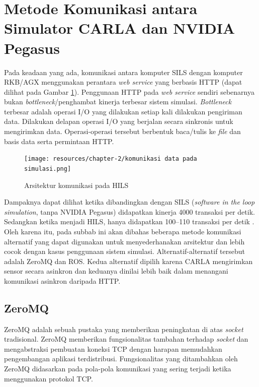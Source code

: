 \section{Metode Komunikasi antara Simulator CARLA dan NVIDIA
  Pegasus}\label{chapter-2-section-comms}

Pada keadaan yang ada, komunikasi antara komputer SILS dengan komputer RKB/AGX
menggunakan perantara \textit{web service} yang berbasis HTTP (dapat dilihat
pada Gambar \ref{chapter-2-old-hils}). Penggunaan HTTP pada \textit{web service}
sendiri sebenarnya bukan \textit{bottleneck}/penghambat kinerja terbesar sistem
simulasi. \textit{Bottleneck} terbesar adalah operasi I/O yang dilakukan setiap
kali dilakukan pengiriman data. Dilakukan delapan operasi I/O yang berjalan
secara sinkronis untuk mengirimkan data. Operasi-operasi tersebut berbentuk
baca/tulis ke \textit{file} dan basis data serta permintaan HTTP.

\begin{figure}[h!]
	\centering
	\texttt{[image: resources/chapter-2/komunikasi
		data pada simulasi.png]}
	\caption{Arsitektur komunikasi pada HILS \parencite{trilaksono_laporanRispro}}
	\label{chapter-2-old-hils}
\end{figure}

Dampaknya dapat dilihat ketika dibandingkan dengan SILS (\textit{software
	in the loop simulation}, tanpa NVIDIA Pegasus) didapatkan kinerja 4000 transaksi
per detik. Sedangkan ketika menjadi HILS, hanya didapatkan 100--110 transaksi per
detik \parencite{trilaksono_laporanRispro}. Oleh karena itu, pada subbab ini
akan dibahas beberapa metode komunikasi alternatif yang dapat digunakan untuk
menyederhanakan arsitektur dan lebih cocok dengan kasus penggunaan sistem
simulasi. Alternatif-alternatif tersebut adalah ZeroMQ dan ROS. Kedua alternatif
dipilih karena CARLA mengirimkan sensor secara asinkron dan keduanya dinilai
lebih baik dalam menangani komunikasi asinkron daripada HTTP.

\subsection{ZeroMQ}\label{chapter-2-section-zeromq}

ZeroMQ adalah sebuah pustaka yang memberikan peningkatan di atas
\textit{socket} tradisional. ZeroMQ memberikan fungsionalitas tambahan terhadap
\textit{socket} dan mengabstraksi pembuatan koneksi TCP dengan harapan
memudahkan pengembangan aplikasi terdistribusi. Fungsionalitas yang ditambahkan
oleh ZeroMQ didasarkan pada pola-pola komunikasi yang sering terjadi ketika
menggunakan protokol TCP.

